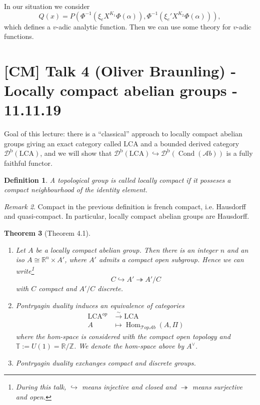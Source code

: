\documentclass[12pt]{article}
\theoremstyle{darkgreentheorem}
\newtheorem{thm}{Theorem}
\theoremstyle{darkbluedefinition}
\newtheorem{defn}[thm]{Definition}
\theoremstyle{darkredexample}
\theoremstyle{remark}
\newtheorem{rem}[thm]{Remark}
\newcommand{\Z}{\mathbb{Z}}
\newcommand{\R}{\mathbb{R}}
\newcommand{\1}{\mathbbm{1}}
\newcommand{\bbT}{\mathbb{T}}
\newcommand{\Top}{\mathscr{T}op}
\newcommand{\Ab}{\mathscr{A}b}
\newcommand{\Db}{\mathscr{D}^{\mathrm{b}}}
\DeclareMathOperator{\Hom}{Hom}
\DeclareMathOperator{\Cond}{Cond}
\newcommand{\dual}{^{\vee}}
\newcommand{\tms}{\times}
\newcommand{\epi}{\twoheadrightarrow}
\newcommand{\mono}{\hookrightarrow}
\newcommand{\LCA}{\mathrm{LCA}}
\begin{document}
In our situation we consider
\[ Q(x)=P(\Phi^{-1}(\xi_{e}X^{K_{1}}\Phi(\alpha)),\Phi^{-1}(\xi_{e}'X^{K_{2}}\Phi(\alpha))),\]
which defines a $v$-adic analytic function.
Then we can use some theory for $v$-adic functions.

\section{[CM] Talk 4 (Oliver Braunling) - Locally compact abelian groups - 11.11.19}

Goal of this lecture: there is a ``classical'' approach to locally compact abelian groups giving an exact category called $\LCA$ and a bounded derived category $\Db(\LCA)$, and we will show that $\Db(\LCA)\mono \Db(\Cond(\Ab))$ is a fully faithful functor.

\begin{defn}
    A topological group is called \textit{locally compact} if it posseses a compact neighbourhood of the identity element.
\end{defn}

\begin{rem}
    Compact in the previous definition is french compact, i.e. Hausdorff and quasi-compact.
    In particular, locally compact abelian groups are Hausdorff.
\end{rem}

\begin{thm}[Theorem 4.1]
    \begin{enumerate}[label=\roman*)]
	\item Let $A$ be a locally compact abelian group.
	    Then there is an integer $n$ and an iso $A\cong \R^{n}\tms A'$, where $A'$ admits a compact open subgroup.
	    Hence we can write\footnote{During this talk, $\mono$ means injective and closed and $\epi$ means surjective and open.}
	    \[ C\mono A'\epi A'/C \]
	    with $C$ compact and $A'/C$ discrete.
	\item Pontryagin duality induces an equivalence of categories
	    \begin{align*}
		\LCA^{op}&\xrightarrow{\sim} \LCA \\
		A & \mapsto \Hom_{\Top\Ab}(A,\Pi)
	    \end{align*}
	    where the hom-space is considered with the compact open topology and $\bbT:=U(1)=\R/\Z$.
	    We denote the hom-space above by $A\dual$.
	\item Pontryagin duality exchanges compact and discrete groups.
    \end{enumerate}
\end{thm}
\end{document}
